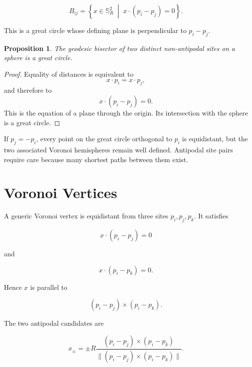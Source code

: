 \documentclass[11pt,fleqn]{book}
\numberwithin{equation}{chapter}
\theoremstyle{plain}
\newtheorem{proposition}[theorem]{Proposition}
\theoremstyle{definition}
\theoremstyle{remark}
\newcommand{\Sphere}{\mathbb{S}^{2}}
\newcommand{\suchthat}{\;\middle|\;}
\begin{document}
\begin{equation}
    B_{ij}
    =
    \left\{
    x\in\Sphere_R
    \suchthat
    x\cdot(p_i-p_j)=0
    \right\}.
\end{equation}

This is a great circle whose defining plane is perpendicular to \(p_i-p_j\).

\begin{proposition}
The geodesic bisector of two distinct non-antipodal sites on a sphere is a great circle.
\end{proposition}

\begin{proof}
Equality of distances is equivalent to
\[
x\cdot p_i=x\cdot p_j,
\]
and therefore to
\[
x\cdot(p_i-p_j)=0.
\]
This is the equation of a plane through the origin. Its intersection with the sphere is a great circle.
\end{proof}

If \(p_j=-p_i\), every point on the great circle orthogonal to \(p_i\) is equidistant, but the two associated Voronoi hemispheres remain well defined. Antipodal site pairs require care because many shortest paths between them exist.

\section{Voronoi Vertices}

A generic Voronoi vertex is equidistant from three sites \(p_i,p_j,p_k\). It satisfies

\begin{equation}
    x\cdot(p_i-p_j)=0
\end{equation}

and

\begin{equation}
    x\cdot(p_i-p_k)=0.
\end{equation}

Hence \(x\) is parallel to

\begin{equation}
    (p_i-p_j)\times(p_i-p_k).
\end{equation}

The two antipodal candidates are

\begin{equation}
    x_{\pm}
    =
    \pm R
    \frac{
      (p_i-p_j)\times(p_i-p_k)
    }{
      \|
      (p_i-p_j)\times(p_i-p_k)
      \|
    }.
\end{equation}
\end{document}
